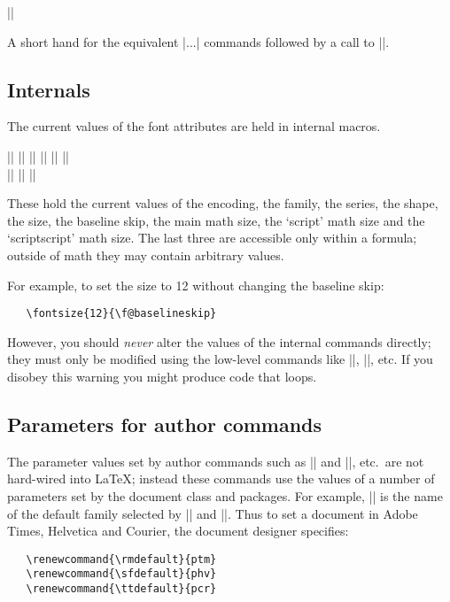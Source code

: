 \documentclass{ltxguide}[1995/11/28]
\begin{document}
\begin{decl}
  |\usefont|    
\end{decl}
A short hand for the equivalent |\font...| commands followed by a call
to |\selectfont|.

\subsection{Internals}

The current values of the font attributes are held in internal macros.

\begin{decl}
  |\f@encoding| \quad
  |\f@family| \quad
  |\f@series| \quad
  |\f@shape|  \quad
  |\f@size| \quad
  |\f@baselineskip| \\
  |\tf@size| \quad
  |\sf@size| \quad
  |\ssf@size|
\end{decl}

These hold the current values of the encoding, the family, the series,
the shape, the size, the baseline skip, the main math size, the `script'
math size and the `scriptscript' math size. The last three are
accessible only within a formula; outside of math they may contain
arbitrary values.

For example, to set the size to 12 without changing the baseline skip:
\begin{verbatim}
   \fontsize{12}{\f@baselineskip}
\end{verbatim}
However, you should \emph{never} alter the values of the internal
commands directly; they must only be modified using the low-level
commands like |\fontfamily|, |\fontseries|, etc. If you disobey this
warning you might produce code that loops.

\subsection{Parameters for author commands}
\label{Sec:text.param}

The parameter values set by author commands such as |\textrm| and
|\rmfamily|, etc.\ are not hard-wired into \LaTeX; instead these
commands use the values of a number of parameters set by the document
class and packages.  For example, |\rmdefault| is the name of the
default family selected by |\textrm| and |\rmfamily|. Thus to set a
document in Adobe Times, Helvetica and Courier, the document designer
specifies:
\begin{verbatim}
   \renewcommand{\rmdefault}{ptm}
   \renewcommand{\sfdefault}{phv}
   \renewcommand{\ttdefault}{pcr}
\end{verbatim}
\end{document}
